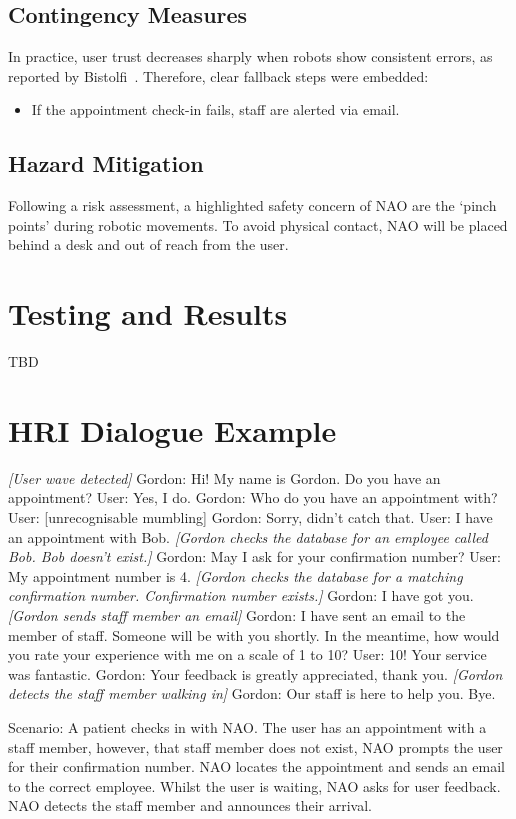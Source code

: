 \documentclass[conference]{IEEEtran}
\begin{document}
\subsection{Contingency Measures} In practice, user trust decreases sharply when robots show consistent errors, as reported by Bistolfi~\cite{Bistolfi2022}.
Therefore, clear fallback steps were embedded:
\begin{itemize}
        \item If the appointment check-in fails, staff are alerted via email.
\end{itemize}

\subsection{Hazard Mitigation} Following a risk assessment, a highlighted safety concern of NAO are the ‘pinch points’ during robotic movements. To avoid physical contact, NAO will be placed behind a desk and out of reach from the user.

\section{Testing and Results}

TBD

\section{HRI Dialogue Example}

\textit{[User wave detected]}
Gordon: Hi! My name is Gordon. Do you have an appointment?
User: Yes, I do.
Gordon: Who do you have an appointment with?
User: [unrecognisable mumbling]
Gordon: Sorry, didn't catch that.
User: I have an appointment with Bob.
\textit{[Gordon checks the database for an employee called Bob. Bob doesn’t exist.]}
Gordon: May I ask for your confirmation number?
User: My appointment number is 4.
\textit{[Gordon checks the database for a matching confirmation number. Confirmation number exists.]}
Gordon: I have got you.
\textit{[Gordon sends staff member an email]}
Gordon: I have sent an email to the member of staff. Someone will be with you shortly.  In the meantime, how would you rate your experience with me on a scale of 1 to 10?
User: 10! Your service was fantastic.
Gordon: Your feedback is greatly appreciated, thank you. 
\textit{[Gordon detects the staff member walking in]}
Gordon: Our staff is here to help you. Bye.

Scenario: A patient checks in with NAO. The user has an appointment with a staff member, however, that staff member does not exist, NAO prompts the user for their confirmation number. NAO locates the appointment and sends an email to the correct employee. Whilst the user is waiting, NAO asks for user feedback. NAO detects the staff member and announces their arrival.
\end{document}
